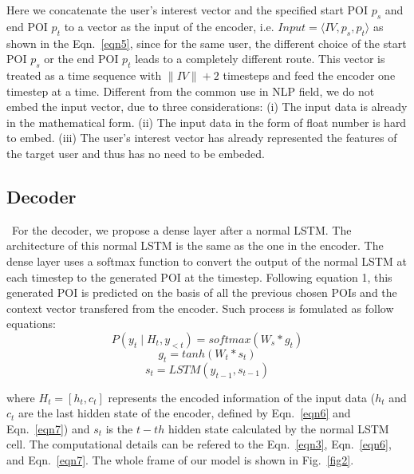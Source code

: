 \documentclass[runningheads]{llncs}
\begin{document}
Here we concatenate the user's interest vector and the specified start POI $p_s$ and end POI $p_t$ to a vector as the input of the encoder, i.e. $Input=\langle IV,p_s,p_t\rangle$ as shown in the Eqn.~\eqref{eqn5}, since for the same user, the different choice of the start POI $p_s$ or the end POI $p_t$ leads to a completely different route. This vector is treated as a time sequence with $\|IV\|+2$ timesteps and feed the encoder one timestep at a time. Different from the common use in NLP field, we do not embed the input vector, due to three considerations: (i) The input data is already in the mathematical form. (ii) The input data in the form of float number is hard to embed. (iii) The user's interest vector has already represented the features of the target user and thus has no need to be embeded.
\subsection{Decoder}
\quad\, For the decoder, we propose a dense layer after a normal LSTM. The architecture of this normal LSTM is the same as the one in the encoder. The dense layer uses a softmax function to convert the output of the normal LSTM at each timestep to the generated POI at the timestep. Following equation 1, this generated POI is predicted on the basis of all the previous chosen POIs and the context vector transfered from the encoder. Such process is fomulated as follow equations:
\begin{equation}
	P(y_t\mid H_t,y_{<t})=softmax(W_s*g_t)
\end{equation}
\begin{equation}
	g_t=tanh(W_t*s_t)
\end{equation}
\begin{equation}
	s_t=LSTM(y_{t-1},s_{t-1})
\end{equation}

where $H_t=[h_t,c_t]$ represents the encoded information of the input data ($h_t$ and $c_t$ are the last hidden state of the encoder, defined by Eqn.~\eqref{eqn6} and Eqn.~\eqref{eqn7}) and $s_t$ is the $t-th$ hidden state calculated by the normal LSTM cell. The computational details can be refered to the Eqn.~\eqref{eqn3}, Eqn.~\eqref{eqn6}, and Eqn.~\eqref{eqn7}. The whole frame of our model is shown in Fig.~\ref{fig2}.
\end{document}
